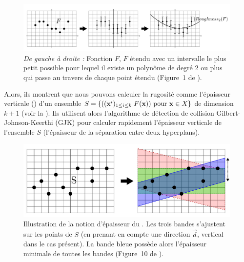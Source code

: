\begin{figure}[ht]{
    \begin{center}
    \includegraphics[width=14cm]{images/Curvature/DLL_roughness}
    \end{center}}
    \caption[Illustration du paramètre $R$ de rugosité de \DLL.]{\emph{De gauche à
    droite : } Fonction $F$, $F$ étendu avec un intervalle le plus petit
    possible pour lequel il existe un polynôme de degré 2 ou plus qui passe au
    travers de chaque point étendu (Figure~1 de
    \cite{Provot2011}).\label{fig:dll-roughness}}
\end{figure}

Alors, ils montrent que nous pouvons calculer la rugosité comme l'épaisseur
verticale () d'un ensemble $S = \{((\mathbf{x}^i)_{1 \le i
\le k} \; F(\mathbf{x})) \text{ pour } \mathbf{x} \in X \}$ de dimension $k + 1$ (voir la
). Ils utilisent alors l'algorithme de détection
de collision Gilbert-Johnson-Keerthi (GJK) \cite{Gilbert1988} pour calculer
rapidement l'épaisseur verticale de l'ensemble $S$ (l'épaisseur de la séparation
entre deux hyperplans).

\begin{figure}[ht]{
    \begin{center}
    \includegraphics[width=14cm]{images/Curvature/DLL_roughness2}
    \end{center}}
    \caption[Illustration de la notion d'épaisseur du \DLL.]{Illustration de la
    notion d'épaisseur du \DLL. Les trois bandes s'ajustent sur les points de
    $S$ (en prenant en compte une direction $\vec{d}$, vertical dans le cas présent).
    La bande bleue possède alors l'épaisseur minimale de toutes les bandes
    (Figure~10 de \cite{ProvotIPOL2014}).\label{fig:dll-roughness2}}
\end{figure}

